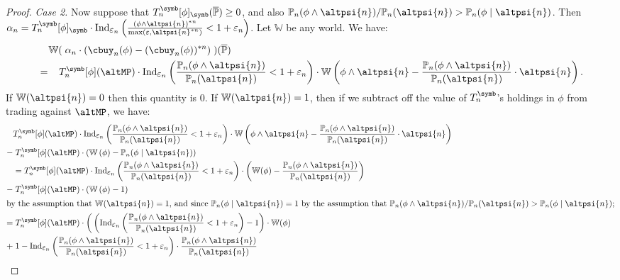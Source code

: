 \documentclass[authordate,onecolumn,noenvironments]{miri-tech-article}
\numberwithin{equation}{subsection}
\newcommand{\seq}[1]{{\overline{#1}}}
\newcommand{\nn}{n}
\newcommand{\trade}{T}%
\newcommand{\BelState}{\mathbb{P}}
\newcommand{\pt}{\BelState}
\newcommand{\MP}{\seq{\pt}}
\newcommand{\World}{\mathbb{W}}
\newcommand{\ctsind}[1]{\operatorname{Ind}_{\text{\small{${#1}$}}}} %
\begin{document}
\begin{proof}
\textit{Case 2.}
Now suppose that $\trade^\symb_n[\phi]_{\symb}(\MP)\geq 0$, and also $\pt_n(\phi \wedge \altpsi{n})/  \pt_n(\altpsi{n})  >  \pt_n (\phi \mid \altpsi{n})$.
Then $\alpha_n = \trade^\symb_n[\phi]_{\symb}\cdot \ctsind{\varepsilon_n}\left(\frac{(\phi \wedge \altpsi{n})^{* n} }{ \max(\varepsilon, \altpsi{n}^{* n})} < 1 + \varepsilon_n\right)$.
Let $\World$ be any world. We have:
%
\begin{align*}
 &\;\;\;\; \World(\; \alpha_n \cdot (\cbuy_n(\phi) - (\cbuy_\nn(\phi))^{* n} )\; )(\MP) \\
   &=\;\;\; \trade^\symb_n[\phi](\altMP)\cdot \ctsind{\varepsilon_n}\left(\frac{\pt_n (\phi \wedge \altpsi{n})}{\pt_n(\altpsi{n}) }  < 1 + \varepsilon_n\right) \cdot \World\left(  \phi \wedge \altpsi{n} - 
 \frac{\pt_n (\phi \wedge \altpsi{n})}{\pt_n(\altpsi{n}) } 
 \cdot \altpsi{n}
 \right).
  \end{align*}
 If $\World(\altpsi{n}) = 0$ then this quantity is 0. If $\World(\altpsi{n}) = 1$, 
then if we subtract off the value of $\trade^\symb_n$'s holdings in $\phi$ from trading against $\altMP$, we have:
\begin{align*}
  &  \trade^\symb_n[\phi](\altMP)\cdot \ctsind{\varepsilon_n}\left(\frac{\pt_n (\phi \wedge \altpsi{n})}{\pt_n(\altpsi{n}) }  < 1 + \varepsilon_n\right) \cdot \World\left(  \phi \wedge \altpsi{n} - 
 \frac{\pt_n (\phi \wedge \altpsi{n})}{\pt_n(\altpsi{n}) } 
 \cdot \altpsi{n}
 \right)\\
 - & \;\trade^\symb_n[\phi](\altMP)\cdot  \left(\World\left(  \phi  \right) 
 -   \pt_n (\phi \mid \altpsi{n})
 \right)\\
 &=  \trade^\symb_n[\phi](\altMP)\cdot \ctsind{\varepsilon_n}\left(\frac{\pt_n (\phi \wedge \altpsi{n})}{\pt_n(\altpsi{n}) }  < 1 + \varepsilon_n\right) \cdot \left( \World( \phi ) - 
 \frac{\pt_n (\phi \wedge \altpsi{n})}{\pt_n(\altpsi{n}) } 
 \right)\\
 - & \;\trade^\symb_n[\phi](\altMP)\cdot  \left(\World\left(  \phi  \right) 
 -  1
 \right)\\
 \intertext{by the assumption that $\World(\altpsi{n}) = 1$, and since $\pt_n (\phi \mid \altpsi{n})= 1$  by the assumption that $\pt_n(\phi \wedge \altpsi{n})/  \pt_n(\altpsi{n})  >  \pt_n (\phi \mid \altpsi{n})$;}
 =&\; \trade^\symb_n[\phi](\altMP)\cdot \bigg(    
 \left(\ctsind{\varepsilon_n}\left(\frac{\pt_n (\phi \wedge \altpsi{n})}{\pt_n(\altpsi{n}) }  < 1 + \varepsilon_n\right)
 -1 \right) \cdot \World(\phi) \\
 +&\; 1 - \ctsind{\varepsilon_n}\left(\frac{\pt_n (\phi \wedge \altpsi{n})}{\pt_n(\altpsi{n}) }  < 1 + \varepsilon_n\right) \cdot \frac{\pt_n (\phi \wedge \altpsi{n})}{\pt_n(\altpsi{n}) }

\end{align*}
\end{proof}
\end{document}
